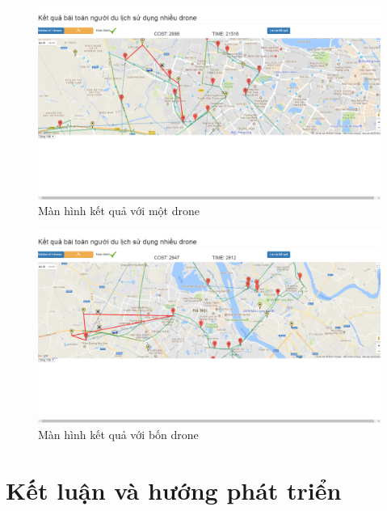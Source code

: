 \documentclass[a4paper,12pt]{report}
\begin{document}
\begin{figure}

\includegraphics[scale=0.41]{screen/solution1.png}
\caption{Màn hình kết quả với một drone}
\label{solution1}
\end{figure}
\begin{figure}

\includegraphics[scale=0.41]{screen/solution2.png}
\caption{Màn hình kết quả với bốn drone}
\label{solution2}
\end{figure}
\chapter*{Kết luận và hướng phát triển}
\end{document}

